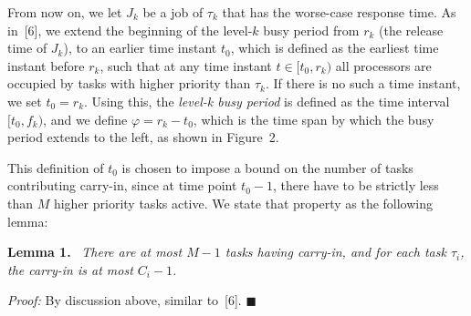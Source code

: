 From now on, we let $J_k$ be a job of $\tau_k$ that has the worse-case response time. As in~[6], we extend the beginning of the level-$k$ busy period from $r_k$ (the release time of $J_k$), to an earlier time instant $t_0$, which is defined as the earliest time instant before $r_k$, such that at any time instant $t \in [t_0, r_k)$ all processors are occupied by tasks with higher priority than $\tau_k$. If there is no such a time instant, we set $t_0 = r_k$. Using this, the \textit{level-k busy period} is defined as the time interval $[t_0, f_k)$, and we define $\varphi = r_k - t_0$, which is the time span by which the busy period extends to the left, as shown in Figure~2.

This definition of $t_0$ is chosen to impose a bound on the number of tasks contributing carry-in, since at time point $t_0 - 1$, there have to be strictly less than $M$ higher priority tasks active. We state that property as the following lemma:

\textbf{Lemma 1.} \ \textit{There are at most $M - 1$ tasks having carry-in, and for each task $\tau_i$, the carry-in is at most $C_i - 1$.}

\textit{Proof:} By discussion above, similar to~[6]. \hfill $\blacksquare$